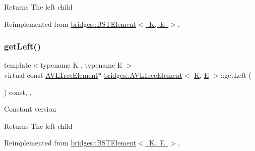 \begin{DoxyReturn}{Returns}
The left child 
\end{DoxyReturn}


Reimplemented from \mbox{\hyperlink{classbridges_1_1_b_s_t_element_a4d8987373c75b51fca94e3c0b78b87a6}{bridges\+::\+B\+S\+T\+Element$<$ K, E $>$}}.

\mbox{\label{classbridges_1_1_a_v_l_tree_element_a61e075db5414b7bd6f52d657401acda3}} 
\subsubsection{\texorpdfstring{getLeft()}{getLeft()}\hspace{0.1cm}{\footnotesize\ttfamily [2/2]}}
{\footnotesize\ttfamily template$<$typename K , typename E $>$ \\
virtual const \mbox{\hyperlink{classbridges_1_1_a_v_l_tree_element}{A\+V\+L\+Tree\+Element}}$\ast$ \mbox{\hyperlink{classbridges_1_1_a_v_l_tree_element}{bridges\+::\+A\+V\+L\+Tree\+Element}}$<$ \mbox{\hyperlink{namespacebridges_acfb0a4f7877d8f63de3e6862004c50edaa5f3c6a11b03839d46af9fb43c97c188}{K}}, \mbox{\hyperlink{namespacebridges_acfb0a4f7877d8f63de3e6862004c50eda3a3ea00cfc35332cedf6e5e9a32e94da}{E}} $>$\+::get\+Left (\begin{DoxyParamCaption}{ }\end{DoxyParamCaption}) const\hspace{0.3cm}{\ttfamily [inline]}, {\ttfamily [override]}, {\ttfamily [virtual]}}

Constant version

\begin{DoxyReturn}{Returns}
The left child 
\end{DoxyReturn}


Reimplemented from \mbox{\hyperlink{classbridges_1_1_b_s_t_element_a2abcfb991f6cc377da2bd9217319fc9c}{bridges\+::\+B\+S\+T\+Element$<$ K, E $>$}}.

\mbox{\label{classbridges_1_1_a_v_l_tree_element_a909b46ebf3e8c6a3434762a1f01499e2}} 
